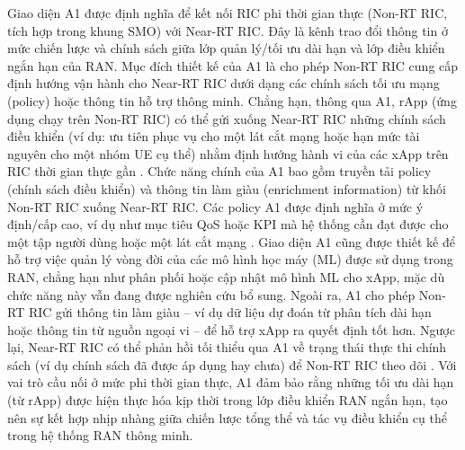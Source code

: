 Giao diện A1 được định nghĩa để kết nối RIC phi thời gian thực (Non-RT RIC, tích hợp trong khung SMO) với Near-RT RIC. Đây là kênh trao đổi thông tin ở mức chiến lược và chính sách giữa lớp quản lý/tối ưu dài hạn và lớp điều khiển ngắn hạn của RAN. Mục đích thiết kế của A1 là cho phép Non-RT RIC cung cấp định hướng vận hành cho Near-RT RIC dưới dạng các chính sách tối ưu mạng (policy) hoặc thông tin hỗ trợ thông minh. Chẳng hạn, thông qua A1, rApp (ứng dụng chạy trên Non-RT RIC) có thể gửi xuống Near-RT RIC những chính sách điều khiển (ví dụ: ưu tiên phục vụ cho một lát cắt mạng hoặc hạn mức tài nguyên cho một nhóm UE cụ thể) nhằm định hướng hành vi của các xApp trên RIC thời gian thực gần \cite{frontiers}. Chức năng chính của A1 bao gồm truyền tải policy (chính sách điều khiển) và thông tin làm giàu (enrichment information) từ khối Non-RT RIC xuống Near-RT RIC. Các policy A1 được định nghĩa ở mức ý định/cấp cao, ví dụ như mục tiêu QoS hoặc KPI mà hệ thống cần đạt được cho một tập người dùng hoặc một lát cắt mạng \cite{Understanding_O-Ran}. Giao diện A1 cũng được thiết kế để hỗ trợ việc quản lý vòng đời của các mô hình học máy (ML) được sử dụng trong RAN, chẳng hạn như phân phối hoặc cập nhật mô hình ML cho xApp, mặc dù chức năng này vẫn đang được nghiên cứu bổ sung. Ngoài ra, A1 cho phép Non-RT RIC gửi thông tin làm giàu – ví dụ dữ liệu dự đoán từ phân tích dài hạn hoặc thông tin từ nguồn ngoại vi – để hỗ trợ xApp ra quyết định tốt hơn. Ngược lại, Near-RT RIC có thể phản hồi tối thiểu qua A1 về trạng thái thực thi chính sách (ví dụ chính sách đã được áp dụng hay chưa) để Non-RT RIC theo dõi \cite{Understanding_O-Ran}. Với vai trò cầu nối ở mức phi thời gian thực, A1 đảm bảo rằng những tối ưu dài hạn (từ rApp) được hiện thực hóa kịp thời trong lớp điều khiển RAN ngắn hạn, tạo nên sự kết hợp nhịp nhàng giữa chiến lược tổng thể và tác vụ điều khiển cụ thể trong hệ thống RAN thông minh.


